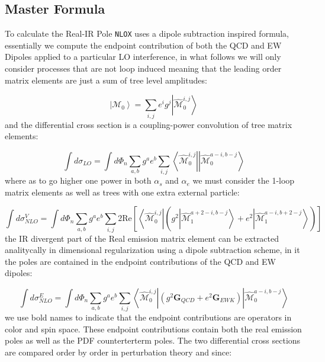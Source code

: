 \documentclass[a4paper]{article}
\def \NLOX{\texttt{NLOX} }
\def \MBra#1#2#3{\left<\hat{\mathcal{M}}_{#1}^{#2,#3}\right|}
\def \MKet#1#2#3{\left|\hat{\mathcal{M}}_{#1}^{#2,#3}\right>}
\begin{document}
\subsection{Master Formula}
To calculate the Real-IR Pole \NLOX uses a dipole subtraction inspired formula, essentially we 
compute the endpoint contribution of both the QCD and EW Dipoles applied to a particular LO 
interference, in what follows we will only consider processes that are not loop induced meaning 
that the leading order matrix elements are just a sum of tree level amplitudes:

\begin{equation}
 \left|\mathcal{M}_{0}\right> = \sum_{i,j}e^i g^j \left|\hat{\mathcal{M}}^{i,j}_{0}\right>
\end{equation}
and the differential cross section is a coupling-power convolution of tree matrix elements:

\begin{equation}
 \int d\sigma_{LO} = \int d\Phi_{n}
 \sum_{a,b} g^{a} e^{b}\sum_{i,j}
 \left<{\hat{\mathcal{M}}}^{i,j}_{0}\right|
 \left|{\hat{\mathcal{M}}}^{a-i,b-j}_{0}\right>
\end{equation}
where as to go higher one power in both $\alpha_s$ and $\alpha_e$ we must consider the 1-loop
matrix elements as well as trees with one extra external particle:

\begin{equation}
 \int d\sigma^V_{NLO} = 
 \int d\Phi_{n}\sum_{a,b}
 g^a e^b 
 \sum_{i,j}
 2\text{Re}\left[
 \MBra{0}{i}{j}
 \left(
  g^2\MKet{1}{a+2-i}{b-j}
 +
 e^2\MKet{1}{a-i}{b+2-j}
 \right)
 \right]
\end{equation}
the IR divergent part of the Real emission matrix element can be extracted analitycally in 
dimensional regularization using a dipole subtraction scheme, in it the poles are contained 
in the endpoint contributions of the QCD and EW dipoles:

\begin{equation}
 \int d\sigma^E_{NLO} = \int d\Phi_{n}
 \sum_{a,b} g^{a} e^{b} 
 \sum_{i,j}
 \MBra{0}{i}{j}
 \left(
 g^2\textbf{G}_{QCD}
 +
 e^2\textbf{G}_{EWK}
 \right)
 \MKet{0}{a-i}{b-j}
\end{equation}
we use bold names to indicate that the endpoint contributions are operators in color and spin space. 
These endpoint contributions contain both the real emission poles as well as the PDF counterterterm poles.
The two differential cross sections are compared order by order in perturbation theory and since:
\end{document}
